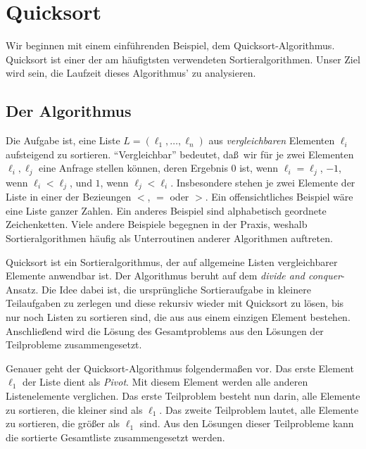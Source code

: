 \documentclass[10pt,reqno]{amsart}
\numberwithin{equation}{section}
\begin{document}
\section{Quicksort}\label{sec_qs}
Wir beginnen mit einem einf\"uhrenden Beispiel, dem Quicksort-Algorithmus.
Quicksort ist einer der am h\"aufigtsten verwendeten Sortieralgorithmen.
Unser Ziel wird sein, die Laufzeit dieses Algorithmus' zu analysieren.

\subsection{Der Algorithmus}\label{sec_qs_alg}
Die Aufgabe ist, eine Liste $L=(\ell_1,\ldots,\ell_n)$ aus {\em vergleichbaren} Elementen $\ell_i$ aufsteigend zu sortieren.
``Vergleichbar'' bedeutet, da\ss\ wir f\"ur je zwei Elementen $\ell_i,\ell_j$ eine Anfrage stellen k\"onnen, deren Ergebnis $0$ ist, wenn $\ell_i=\ell_j$, $-1$, wenn $\ell_i<\ell_j$, und $1$, wenn $\ell_j<\ell_i$.
Insbesondere stehen je zwei Elemente der Liste in einer der Bezieungen $<$, $=$ oder $>$.
Ein offensichtliches Beispiel w\"are eine Liste ganzer Zahlen.
Ein anderes Beispiel sind alphabetisch geordnete Zeichenketten.
Viele andere Beispiele begegnen in der Praxis, weshalb Sortieralgorithmen h\"aufig als Unterroutinen anderer Algorithmen auftreten.

Quicksort ist ein Sortieralgorithmus, der auf allgemeine Listen vergleichbarer Elemente anwendbar ist.
Der Algorithmus beruht auf dem {\em divide and conquer}-Ansatz.
Die Idee dabei ist, die urspr\"ungliche Sortieraufgabe in kleinere Teilaufgaben zu zerlegen und diese rekursiv wieder mit Quicksort zu l\"osen, bis nur noch Listen zu sortieren sind, die aus aus einem einzigen Element bestehen.
Anschlie\ss end wird die L\"osung des Gesamtproblems aus den L\"osungen der Teilprobleme zusammengesetzt.

Genauer geht der Quicksort-Algorithmus folgenderma\ss en vor.
Das erste Element $\ell_1$ der Liste dient als {\em Pivot}.
Mit diesem Element werden alle anderen Listenelemente verglichen.
Das erste Teilproblem besteht nun darin, alle Elemente zu sortieren, die kleiner sind als $\ell_1$.
Das zweite Teilproblem lautet, alle Elemente zu sortieren, die gr\"o\ss er als $\ell_1$ sind.
Aus den L\"osungen dieser Teilprobleme kann die sortierte Gesamtliste zusammengesetzt werden.
\end{document}

